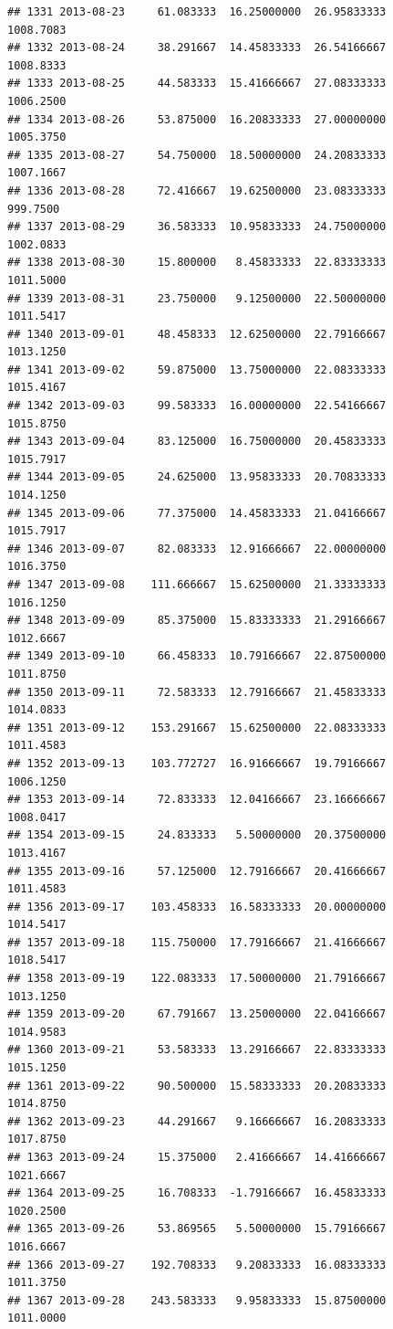 \documentclass[
]{article}
\begin{document}
\begin{verbatim}
## 1331 2013-08-23     61.083333  16.25000000  26.95833333    1008.7083
## 1332 2013-08-24     38.291667  14.45833333  26.54166667    1008.8333
## 1333 2013-08-25     44.583333  15.41666667  27.08333333    1006.2500
## 1334 2013-08-26     53.875000  16.20833333  27.00000000    1005.3750
## 1335 2013-08-27     54.750000  18.50000000  24.20833333    1007.1667
## 1336 2013-08-28     72.416667  19.62500000  23.08333333     999.7500
## 1337 2013-08-29     36.583333  10.95833333  24.75000000    1002.0833
## 1338 2013-08-30     15.800000   8.45833333  22.83333333    1011.5000
## 1339 2013-08-31     23.750000   9.12500000  22.50000000    1011.5417
## 1340 2013-09-01     48.458333  12.62500000  22.79166667    1013.1250
## 1341 2013-09-02     59.875000  13.75000000  22.08333333    1015.4167
## 1342 2013-09-03     99.583333  16.00000000  22.54166667    1015.8750
## 1343 2013-09-04     83.125000  16.75000000  20.45833333    1015.7917
## 1344 2013-09-05     24.625000  13.95833333  20.70833333    1014.1250
## 1345 2013-09-06     77.375000  14.45833333  21.04166667    1015.7917
## 1346 2013-09-07     82.083333  12.91666667  22.00000000    1016.3750
## 1347 2013-09-08    111.666667  15.62500000  21.33333333    1016.1250
## 1348 2013-09-09     85.375000  15.83333333  21.29166667    1012.6667
## 1349 2013-09-10     66.458333  10.79166667  22.87500000    1011.8750
## 1350 2013-09-11     72.583333  12.79166667  21.45833333    1014.0833
## 1351 2013-09-12    153.291667  15.62500000  22.08333333    1011.4583
## 1352 2013-09-13    103.772727  16.91666667  19.79166667    1006.1250
## 1353 2013-09-14     72.833333  12.04166667  23.16666667    1008.0417
## 1354 2013-09-15     24.833333   5.50000000  20.37500000    1013.4167
## 1355 2013-09-16     57.125000  12.79166667  20.41666667    1011.4583
## 1356 2013-09-17    103.458333  16.58333333  20.00000000    1014.5417
## 1357 2013-09-18    115.750000  17.79166667  21.41666667    1018.5417
## 1358 2013-09-19    122.083333  17.50000000  21.79166667    1013.1250
## 1359 2013-09-20     67.791667  13.25000000  22.04166667    1014.9583
## 1360 2013-09-21     53.583333  13.29166667  22.83333333    1015.1250
## 1361 2013-09-22     90.500000  15.58333333  20.20833333    1014.8750
## 1362 2013-09-23     44.291667   9.16666667  16.20833333    1017.8750
## 1363 2013-09-24     15.375000   2.41666667  14.41666667    1021.6667
## 1364 2013-09-25     16.708333  -1.79166667  16.45833333    1020.2500
## 1365 2013-09-26     53.869565   5.50000000  15.79166667    1016.6667
## 1366 2013-09-27    192.708333   9.20833333  16.08333333    1011.3750
## 1367 2013-09-28    243.583333   9.95833333  15.87500000    1011.0000

\end{verbatim}
\end{document}
